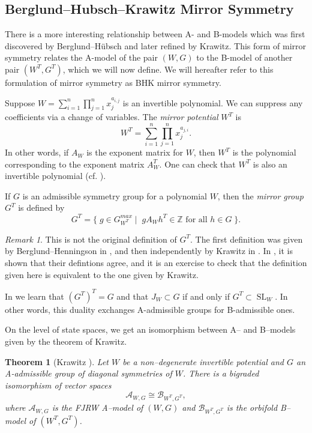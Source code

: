 \documentclass[10pt, letterpaper]{amsart}
\newtheorem{thm}{Theorem}%
\theoremstyle{remark}
\newtheorem{rem}{Remark}[thm]
\newcommand{\ZZ}{\mathbb{Z}}
\newcommand{\sA}{\mathscr{A}}
\newcommand{\sB}{\mathscr{B}}
\newcommand{\set}[1]{\{#1\}}
\newcommand{\defital}{\textit}
\DeclareMathOperator{\SL}{SL}
\begin{document}
\subsection{Berglund--Hubsch--Krawitz Mirror Symmetry}\label{sec:BHK}
There is a more interesting relationship between A- and B-models which was first discovered by Berglund--H\"ubsch and later refined by Krawitz. This form of mirror symmetry relates the A-model of the pair $(W,G)$ to the B-model of another pair $(W^T, G^T)$, which we will now define. We will hereafter refer to this formulation of mirror symmetry as BHK mirror symmetry.  

Suppose $W=\sum_{i=1}^n  \prod_{j=1}^n x_j^{a_{i,j}}$ is an invertible polynomial. We can suppress any coefficients via a change of variables. The \defital{mirror potential} $W^T$ is 
\[
W^T = \sum_{i=1}^n  \prod_{j=1}^n x_j^{a_{j,i}}. 
\]
In other words, if $A_W$ is the exponent matrix for $W$, then $W^T$ is the polynomial corresponding to the exponent matrix $A_W^T$. One can check that $W^T$ is also an invertible polynomial (cf. \cite{ChR1}). 
 
If $G$ is an admissible symmetry group for a polynomial $W$, then the \defital{mirror group} $G^T$ is defined by 
\[
G^T = \set{\; g \in G_{W^T}^{max} \; | \;\;g A_{W} h^T \in \ZZ \text{ for all } h \in G \; }.
\]
\begin{rem}
This is not the original definition of $G^T$. The first definition was given by Berglund--Henningson in \cite{BHen}, and then independently by Krawitz in \cite{Kr}. In \cite{involutions}, it is shown that their defintions agree, and it is an exercise to check that the definition given here is equivalent to the one given by Krawitz. 
\end{rem}


In \cite[Proposition 3]{involutions} we learn that $(G^T)^T = G$ and that $J_W\subset G$ if and only if $G^T\subset \SL_W$. In other words, this duality exchanges A-admissible groups for B-admissible ones. 

On the level of state spaces, we get an isomorphism between A-- and B--models given by the theorem of Krawitz.

\begin{thm}[Krawitz \cite{Kr}]\label{t:krawitz}
Let $W$ be a non--degenerate invertible potential and $G$ an A-admissible group of diagonal symmetries of $W$.
There is a bigraded isomorphism of vector spaces
\[\sA_{W,G} \cong \sB_{W^T ,G^T} ,\]
where $\sA_{W,G}$ is the FJRW A--model of $(W, G)$ and $\sB_{W^T ,G^T}$ is the orbifold B--model of $(W^T
, G^T)$.
\end{thm}
\end{document}
